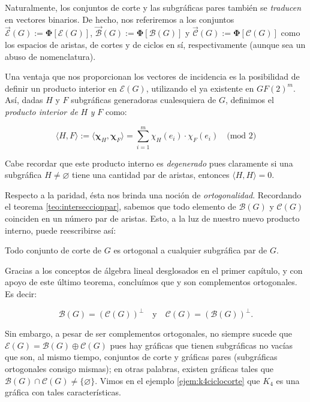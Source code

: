 Naturalmente, los conjuntos de corte y las subgráficas pares también se \textit{traducen} en vectores binarios. De hecho, nos referiremos a los conjuntos $\overrightarrow{\mathcal{E}}(G):=\boldsymbol{\Phi}[\mathcal{E}(G)]$, $\overrightarrow{\mathcal{B}}(G):=\boldsymbol{\Phi}[\mathcal{B}(G)]$ y $\overrightarrow{\mathcal{C}}(G):=\boldsymbol{\Phi}[\mathcal{C}(G)]$ como los espacios de aristas, de cortes y de ciclos en sí, respectivamente (aunque sea un abuso de nomenclatura).

Una ventaja que nos proporcionan los vectores de incidencia es la posibilidad de definir un producto interior en $\mathcal{E}(G)$, utilizando el ya existente en $GF(2)^m$. Así, dadas $H$ y $F$ subgráficas generadoras cualesquiera de $G$, definimos el \textit{producto interior de} $H$ \textit{y} $F$ como:

$$
\langle H,F \rangle  :=  \langle \boldsymbol{\chi}_{H},\boldsymbol{\chi}_{F}\rangle =  \sum_{i=1}^{m} \chi_{H}(e_{i}) \cdot \chi_{F}(e_{i}) \quad \text{(mod }2)
$$

Cabe recordar que este producto interno es \textit{degenerado} pues claramente si una subgráfica $H \neq \varnothing$ tiene una cantidad par de aristas, entonces $\langle H,H\rangle = 0$.

Respecto a la paridad, ésta nos brinda una noción de \textit{ortogonalidad}. Recordando el teorema \ref{teo:interseccionpar}, sabemos que todo elemento de $\mathcal{B}(G)$ y $\mathcal{C}(G)$ coinciden en un número par de aristas. Esto, a la luz de nuestro nuevo producto interno, puede reescribirse así:

\begin{teo}
Todo conjunto de corte de $G$ es ortogonal a cualquier subgráfica par de $G$.
\end{teo}


Gracias a los conceptos de álgebra lineal desglosados en el primer capítulo, y con apoyo de este último teorema, concluímos que \bond y \cycle son complementos ortogonales. Es decir:

$$
\mathcal{B}(G)=(\mathcal{C}(G))^{\perp} \quad \text{y} \quad \mathcal{C}(G)=(\mathcal{B}(G))^{\perp}. 
$$

Sin embargo, a pesar de ser complementos ortogonales, no siempre sucede que $\mathcal{E}(G) = \mathcal{B}(G) \oplus \mathcal{C}(G)$ pues hay gráficas que tienen subgráficas no vacías que son, al mismo tiempo, conjuntos de corte y gráficas pares (subgráficas ortogonales consigo mismas); en otras palabras, existen gráficas tales que $\mathcal{B}(G) \cap \mathcal{C}(G) \neq \{ \varnothing\}$. Vimos en el ejemplo \ref{ejem:k4ciclocorte} que $K_{4}$ es una gráfica con tales características.

